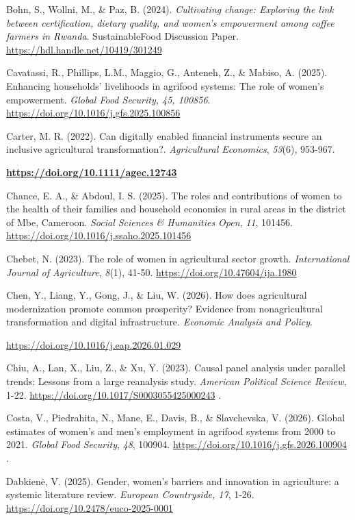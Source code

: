 \documentclass[
]{article}
\begin{document}
Bohn, S., Wollni, M., \& Paz, B. (2024). \emph{Cultivating change:
Exploring the link between certification, dietary quality, and women's
empowerment among coffee farmers in Rwanda}. SustainableFood Discussion
Paper. \url{https://hdl.handle.net/10419/301249}

Cavatassi, R., Phillips, L.M., Maggio, G., Anteneh, Z., \& Mabiso, A.
(2025). Enhancing households' livelihoods in agrifood systems: The role
of women's empowerment. \emph{Global Food Security, 45, 100856}.
\url{https://doi.org/10.1016/j.gfs.2025.100856}

Carter, M. R. (2022). Can digitally enabled financial instruments secure
an inclusive agricultural transformation?. \emph{Agricultural
Economics}, \emph{53}(6), 953-967.

\href{https://doi.org/10.1111/agec.12743}{\textbf{https://doi.org/10.1111/agec.12743}}

Chance, E. A., \& Abdoul, I. S. (2025). The roles and contributions of
women to the health of their families and household economics in rural
areas in the district of Mbe, Cameroon. \emph{Social Sciences \&
Humanities Open}, \emph{11}, 101456.
\url{https://doi.org/10.1016/j.ssaho.2025.101456}

Chebet, N. (2023). The role of women in agricultural sector growth.
\emph{International Journal of Agriculture}, \emph{8}(1), 41-50.
\url{https://doi.org/10.47604/ija.1980}

Chen, Y., Liang, Y., Gong, J., \& Liu, W. (2026). How does agricultural
modernization promote common prosperity? Evidence from nonagricultural
transformation and digital infrastructure. \emph{Economic Analysis and
Policy}.

\url{https://doi.org/10.1016/j.eap.2026.01.029}

Chiu, A., Lan, X., Liu, Z., \& Xu, Y. (2023). Causal panel analysis
under parallel trends: Lessons from a large reanalysis study.
\emph{American Political Science Review}, 1-22.
\url{https://doi.org/10.1017/S0003055425000243} .

Costa, V., Piedrahita, N., Mane, E., Davis, B., \& Slavchevska, V.
(2026). Global estimates of women's and men's employment in agrifood
systems from 2000 to 2021. \emph{Global Food Security}, \emph{48},
100904. \url{https://doi.org/10.1016/j.gfs.2026.100904} .

Dabkienė, V. (2025). Gender, women's barriers and innovation in
agriculture: a systemic literature review. \emph{European Countryside,
17}, 1-26. \url{https://doi.org/10.2478/euco-2025-0001}
\end{document}
